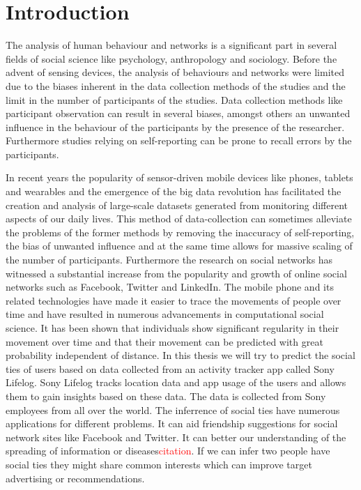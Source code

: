 \chapter{Introduction}
The analysis of human behaviour and networks is a significant part in several fields of social science like psychology, anthropology and sociology. Before the advent of sensing devices, the analysis of behaviours and networks were limited due to the biases inherent in the data collection methods of the studies and the limit in the number of participants of the studies. Data collection methods like participant observation can result in several biases, amongst others an unwanted influence in the behaviour of the participants by the presence of the researcher\cite{rosenthal1966experimenter}. Furthermore studies relying on self-reporting can be prone to recall errors by the participants\cite{stone1999science}.

In recent years the popularity of sensor-driven mobile devices like phones, tablets and wearables and the emergence of the big data revolution has facilitated the creation and analysis of large-scale datasets generated from monitoring different aspects of our daily lives\cite{lazer2009life}. This method of data-collection can sometimes alleviate the problems of the former methods by removing the inaccuracy of self-reporting, the bias of unwanted influence and at the same time allows for massive scaling of the number of participants. Furthermore the research on social networks has witnessed a substantial increase from the popularity and growth of online social networks such as Facebook, Twitter and LinkedIn\cite{social_networks}. The mobile phone and its related technologies have made it easier to trace the movements of people over time and have resulted in numerous advancements in computational social science. It has been shown that individuals show significant regularity in their movement over time\cite{gonzalez2008understanding} and that their movement can be predicted with great probability independent of distance\cite{song2010limits}. In this thesis we will try to predict the social ties of users based on data collected from an activity tracker app called Sony Lifelog\cite{sonyLifeLog}. Sony Lifelog tracks location data and app usage of the users and allows them to gain insights based on these data. The data is collected from Sony employees from all over the world.
The inferrence of social ties have numerous applications for different problems. It can aid friendship suggestions for social network sites like Facebook and Twitter. It can better our understanding of the spreading of information or diseases\textcolor{red}{citation}. If we can infer two people have social ties they might share common interests which can improve target advertising or recommendations.

